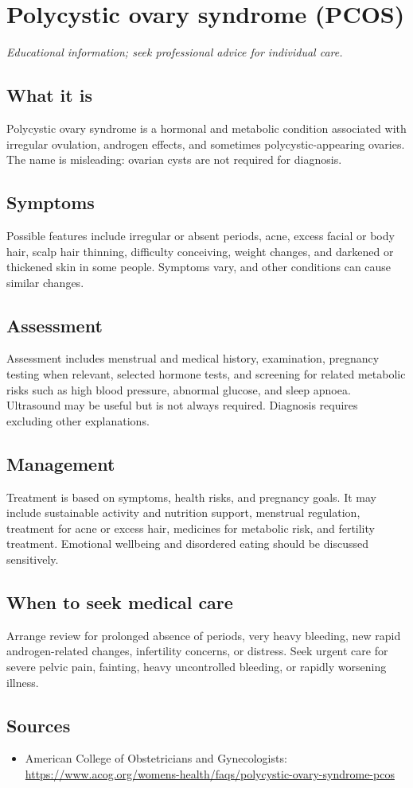 \chapter{Polycystic ovary syndrome (PCOS)}

\medskip
\noindent\textit{Educational information; seek professional advice for individual care.}

\section*{What it is}
Polycystic ovary syndrome is a hormonal and metabolic condition associated with irregular ovulation, androgen effects, and sometimes polycystic-appearing ovaries. The name is misleading: ovarian cysts are not required for diagnosis.

\section*{Symptoms}
Possible features include irregular or absent periods, acne, excess facial or body hair, scalp hair thinning, difficulty conceiving, weight changes, and darkened or thickened skin in some people. Symptoms vary, and other conditions can cause similar changes.

\section*{Assessment}
Assessment includes menstrual and medical history, examination, pregnancy testing when relevant, selected hormone tests, and screening for related metabolic risks such as high blood pressure, abnormal glucose, and sleep apnoea. Ultrasound may be useful but is not always required. Diagnosis requires excluding other explanations.

\section*{Management}
Treatment is based on symptoms, health risks, and pregnancy goals. It may include sustainable activity and nutrition support, menstrual regulation, treatment for acne or excess hair, medicines for metabolic risk, and fertility treatment. Emotional wellbeing and disordered eating should be discussed sensitively.

\section*{When to seek medical care}
Arrange review for prolonged absence of periods, very heavy bleeding, new rapid androgen-related changes, infertility concerns, or distress. Seek urgent care for severe pelvic pain, fainting, heavy uncontrolled bleeding, or rapidly worsening illness.

\section*{Sources}
\begin{itemize}
\item American College of Obstetricians and Gynecologists: \url{https://www.acog.org/womens-health/faqs/polycystic-ovary-syndrome-pcos}
\end{itemize}
